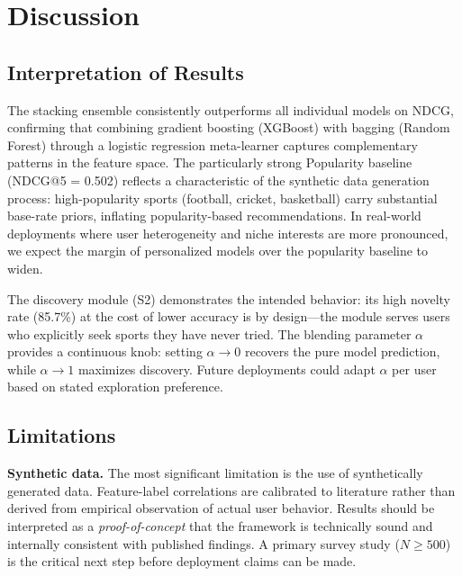 \documentclass[conference]{IEEEtran}
\begin{document}
\section{Discussion}
\label{sec:discussion}

\subsection{Interpretation of Results}

The stacking ensemble consistently outperforms all individual models on
NDCG, confirming that combining gradient boosting (XGBoost) with bagging
(Random Forest) through a logistic regression meta-learner captures
complementary patterns in the feature space.
The particularly strong Popularity baseline (NDCG@5 = 0.502) reflects a
characteristic of the synthetic data generation process: high-popularity
sports (football, cricket, basketball) carry substantial base-rate priors,
inflating popularity-based recommendations. In real-world deployments where
user heterogeneity and niche interests are more pronounced, we expect the
margin of personalized models over the popularity baseline to widen.

The discovery module (S2) demonstrates the intended behavior: its high
novelty rate (85.7\%) at the cost of lower accuracy is by design---the
module serves users who explicitly seek sports they have never tried.
The blending parameter $\alpha$ provides a continuous knob: setting
$\alpha \to 0$ recovers the pure model prediction, while $\alpha \to 1$
maximizes discovery. Future deployments could adapt $\alpha$ per user based
on stated exploration preference.

\subsection{Limitations}

\noindent\textbf{Synthetic data.}
The most significant limitation is the use of synthetically generated data.
Feature-label correlations are calibrated to literature rather than derived
from empirical observation of actual user behavior. Results should be
interpreted as a \textit{proof-of-concept} that the framework is technically
sound and internally consistent with published findings.
A primary survey study ($N \geq 500$) is the critical next step before
deployment claims can be made.
\end{document}
